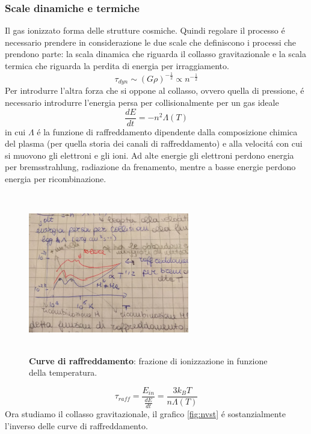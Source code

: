 \documentclass[12pt, a4paper]{article}
\begin{document}
\subsubsection{Scale dinamiche e termiche}
Il gas ionizzato forma delle strutture cosmiche. Quindi regolare il processo \'{e} necessario prendere in considerazione le due scale che definiscono i processi che prendono parte: la scala dinamica che riguarda il collasso gravitazionale e la scala termica che riguarda la perdita di energia per irraggiamento.
\begin{equation}
\tau_{dyn}\sim (G\rho)^{-\frac{1}{2}}\propto n^{-\frac{1}{2}}
\end{equation}
Per introdurre l'altra forza che si oppone al collasso, ovvero quella di pressione, \'{e} necessario introdurre l'energia persa per collisionalmente per un gas ideale
\begin{equation}
\frac{dE}{dt}=-n^2 \Lambda(T)
\end{equation}
in cui $\Lambda$ \'{e} la funzione di raffreddamento dipendente dalla composizione chimica del plasma (per quella storia dei canali di raffreddamento) e alla velocit\'{a} con cui si muovono gli elettroni e gli ioni. Ad alte energie gli elettroni perdono energia per bremsstrahlung, radiazione da frenamento, mentre a basse energie perdono energia per ricombinazione.
\begin{figure}[htp]
\centering
\includegraphics[width=7cm, height=7cm]{images/hratevst.jpeg}
\caption{\textbf{Curve di raffreddamento}: frazione di ionizzazione in funzione della temperatura.}
\label{fig:hratevst}
\end{figure}
\begin{equation}
\tau_{raff}=\frac{E_{in}}{\frac{dE}{dt}}=\frac{3k_B T}{n\Lambda(T)}
\end{equation}
Ora studiamo il collasso gravitazionale, il grafico \ref{fig:nvst} \'{e} sostanzialmente l'inverso delle curve di raffreddamento. 
\end{document}
